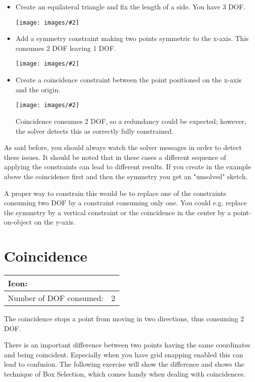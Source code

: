 \documentclass[12pt,titlepage]{article}
\newcommand{\icon}[1]{\raisebox{-1em}{\rule{0pt}{27pt}\texttt{[image: images/\#1]}}}
\newcommand{\img}[2]{\vspace{2ex}\noindent\texttt{[image: images/\#2]}}
\newcommand{\dofConsumed}{Number of DOF consumed:}
\begin{document}
\begin{description}
	
\begin{itemize} 
\item Create an equilateral triangle and fix the length of a side. You have 3 DOF.
		
		\newcommand{\scale}{0.66}%
		\img{scale=\scale}{equiTriangle1}
		
		
\item Add a symmetry constraint making two points symmetric to the x-axis. This consumes 2 DOF leaving 1 DOF.
		
		\img{scale=\scale}{equiTriangle2}
		
		
\item Create a coincidence constraint between the point positioned on the x-axis and the origin.
		
		\img{scale=\scale}{equiTriangle3}
		
		Coincidence consumes 2 DOF, so a redundancy could be expected; however, the solver detects this as correctly fully constrained. 
\end{itemize} 
	
	As said before, you should always watch the solver messages in order to detect these issues. It should be noted that in these cases a different sequence of applying the constraints can lead to different results. If you create in the example above the coincidence first and then the symmetry you get an "unsolved" sketch.
	
	A proper way to constrain this would be to replace one of the constraints consuming two DOF by a constraint consuming only one. You could e.g. replace the symmetry by a vertical constraint or the coincidence in the center by a point-on-object on the y-axis. \end{description}


\section{Coincidence} \begin{tabular}{|l|l|} \hline Icon: & \icon{Constraint_PointOnPoint}\\ \hline \dofConsumed & 2 \\ \hline \end{tabular}

The coincidence stops a point from moving in two directions, thus consuming 2 DOF.

There is an important difference between two points having the same coordinates and being coincident. Especially when you have grid snapping enabled this can lead to confusion. The following exercise will show the difference and shows the technique of Box Selection, which comes handy when dealing with coincidences.
\end{document}
